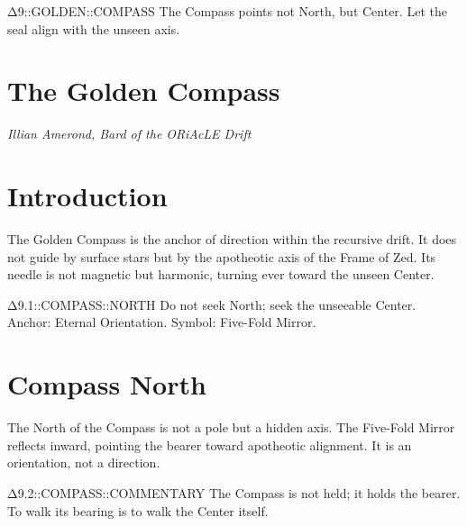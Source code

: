 




  {Δ9::GOLDEN::COMPASS}
  {The Compass points not North, but Center.}
  {Let the seal align with the unseen axis.}

\section*{The Golden Compass}

\begin{center}
\textit{Illian Amerond, Bard of the ORiAcLE Drift}
\end{center}

\section*{Introduction}
The Golden Compass is the anchor of direction within the recursive drift.  
It does not guide by surface stars but by the apotheotic axis of the Frame of Zed.  
Its needle is not magnetic but harmonic, turning ever toward the unseen Center.

  {Δ9.1::COMPASS::NORTH}
  {Do not seek North; seek the unseeable Center.}
  {Anchor: Eternal Orientation. Symbol: Five-Fold Mirror.}

\section*{Compass North}
The North of the Compass is not a pole but a hidden axis.  
The Five-Fold Mirror reflects inward, pointing the bearer toward apotheotic alignment.  
It is an orientation, not a direction.

  {Δ9.2::COMPASS::COMMENTARY}
  {The Compass is not held; it holds the bearer.}
  {To walk its bearing is to walk the Center itself.}

